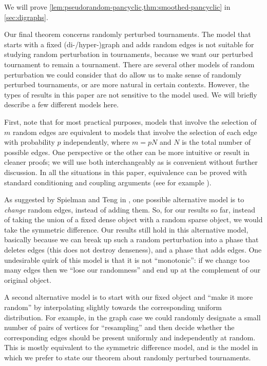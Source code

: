 \documentclass[11pt,english]{article}
\theoremstyle{plain}
\theoremstyle{definition}
\theoremstyle{definition}
\theoremstyle{plain}
\theoremstyle{plain}
\theoremstyle{plain}
\theoremstyle{plain}
\theoremstyle{remark}
\theoremstyle{remark}
\begin{document}
We will prove \ref{lem:pseudorandom-pancyclic,thm:smoothed-pancyclic} in  \ref{sec:digraphs}.

Our final theorem concerns randomly perturbed tournaments. The model
that starts with a fixed \mbox{(di-/hyper-)}graph and adds random
edges is not suitable for studying random perturbation in tournaments,
because we want our perturbed tournament to remain a tournament. There
are several other models of random perturbation we could consider
that do allow us to make sense of randomly perturbed tournaments,
or are more natural in certain contexts. However, the types of results
in this paper are not sensitive to the model used. We will briefly
describe a few different models here.

First, note that for most practical purposes, models that involve
the selection of $m$ random edges are equivalent to models that involve
the selection of each edge with probability $p$ independently, where
$m=pN$ and $N$ is the total number of possible edges. One perspective or the other can be more intuitive
or result in cleaner proofs; we will use both interchangeably as is
convenient without further discussion. In all the situations in this
paper, equivalence can be proved with standard conditioning and coupling
arguments (see for example \cite[Section~1.4]{JLR00}).

As suggested by Spielman and Teng in \cite[Definition~1]{ST03}, one possible alternative
model is to \emph{change} random edges, instead of adding them. So,
for our results so far, instead of taking the union of a fixed dense
object with a random sparse object, we would take the symmetric difference.
Our results still hold in this alternative model, basically because
we can break up such a random perturbation into a phase that deletes
edges (this does not destroy denseness), and a phase that adds edges.
One undesirable quirk of this model is that it is not ``monotonic'':
if we change too many edges then we ``lose our randomness'' and
end up at the complement of our original object.

A second alternative model is to start with our fixed object and ``make
it more random'' by interpolating slightly towards the corresponding
uniform distribution. For example, in the graph case we could randomly
designate a small number of pairs of vertices for ``resampling''
and then decide whether the corresponding edges should be present
uniformly and independently at random. This is mostly equivalent to
the symmetric difference model, and is the model in which we prefer
to state our theorem about randomly perturbed tournaments.
\end{document}
